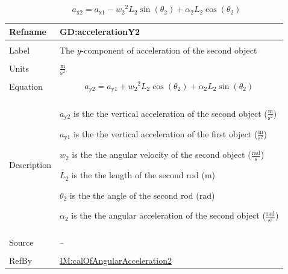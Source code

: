 \documentclass[12pt]{article}
\begin{document}
\begin{displaymath}
{a_{\text{x}2}}={a_{\text{x}1}}-{w_{2}}^{2} {L_{2}} \sin\left({θ_{2}}\right)+{α_{2}} {L_{2}} \cos\left({θ_{2}}\right)
\end{displaymath}
\vspace{\baselineskip}
\noindent
\begin{minipage}{\textwidth}
\begin{tabular}{>{\raggedright}p{}>{\raggedright\arraybackslash}p{}}
\toprule \textbf{Refname} & \textbf{GD:accelerationY2}
\label{GD:accelerationY2}
\\ \midrule \\
Label & The $y$-component of acceleration of the second object
        
\\ \midrule \\
Units & $\frac{\text{m}}{\text{s}^{2}}$
        
\\ \midrule \\
Equation & \begin{displaymath}
           {a_{\text{y}2}}={a_{\text{y}1}}+{w_{2}}^{2} {L_{2}} \cos\left({θ_{2}}\right)+{α_{2}} {L_{2}} \sin\left({θ_{2}}\right)
           \end{displaymath}
\\ \midrule \\
Description & \begin{symbDescription}
              \item{${a_{\text{y}2}}$ is the the vertical acceleration of the second object ($\frac{\text{m}}{\text{s}^{2}}$)}
              \item{${a_{\text{y}1}}$ is the the vertical acceleration of the first object ($\frac{\text{m}}{\text{s}^{2}}$)}
              \item{${w_{2}}$ is the the angular velocity of the second object ($\frac{\text{rad}}{\text{s}}$)}
              \item{${L_{2}}$ is the the length of the second rod (${\text{m}}$)}
              \item{${θ_{2}}$ is the the angle of the second rod (${\text{rad}}$)}
              \item{${α_{2}}$ is the the angular acceleration of the second object ($\frac{\text{rad}}{\text{s}^{2}}$)}
              \end{symbDescription}
\\ \midrule \\
Source & --
         
\\ \midrule \\
RefBy & \hyperref[IM:calOfAngularAcceleration2]{IM:calOfAngularAcceleration2}
        
\\ \bottomrule
\end{tabular}
\end{minipage}
\end{document}
